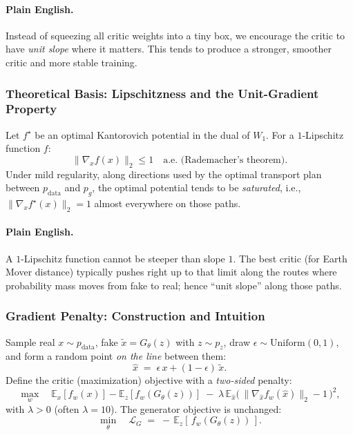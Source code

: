 \documentclass[11pt]{article}
\theoremstyle{remark}
\begin{document}
\paragraph{Plain English.}
Instead of squeezing all critic weights into a tiny box, we encourage the critic to have \emph{unit slope} where it matters. This tends to produce a stronger, smoother critic and more stable training.

\subsubsection{Theoretical Basis: Lipschitzness and the Unit-Gradient Property}
Let $f^\star$ be an optimal Kantorovich potential in the dual of $W_1$. For a $1$-Lipschitz function $f$:
\[
\|\nabla_x f(x)\|_2 \le 1 \quad \text{a.e. (Rademacher's theorem).}
\]
Under mild regularity, along directions used by the optimal transport plan between $p_{\text{data}}$ and $p_g$, the optimal potential tends to be \emph{saturated}, i.e., $\|\nabla_x f^\star(x)\|_2 = 1$ almost everywhere on those paths.

\paragraph{Plain English.}
A $1$-Lipschitz function cannot be steeper than slope $1$. The best critic (for Earth Mover distance) typically pushes right up to that limit along the routes where probability mass moves from fake to real; hence ``unit slope'' along those paths.

\subsubsection{Gradient Penalty: Construction and Intuition}
Sample real $x\!\sim\!p_{\text{data}}$, fake $\tilde{x}\!=\!G_\theta(z)$ with $z\!\sim\!p_z$, draw $\epsilon\!\sim\!\mathrm{Uniform}(0,1)$, and form a random point \emph{on the line} between them:
\[
\hat{x} \;=\; \epsilon\,x + (1-\epsilon)\,\tilde{x}.
\]
Define the critic (maximization) objective with a \emph{two-sided} penalty:
\begin{equation}
\max_{w}\quad
\mathbb{E}_{x}[f_w(x)] - \mathbb{E}_{z}[f_w(G_\theta(z))]
\;-\;
\lambda\,\mathbb{E}_{\hat{x}}
\Big(\,\|\nabla_{\hat{x}} f_w(\hat{x})\|_2 - 1\,\Big)^2,
\label{eq:wgan-gp-critic}
\end{equation}
with $\lambda>0$ (often $\lambda\!=\!10$). The generator objective is unchanged:
\[
\min_{\theta}\quad \mathcal{L}_G \;=\; -\,\mathbb{E}_{z}[\,f_w(G_\theta(z))\,].
\]
\end{document}
